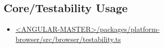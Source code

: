 \subsection{Core/Testability Usage}








\begin{itemize}
  \item \href{https://github.com/angular/angular/blob/master/packages/platform-browser/src/browser/testability.ts}
        {<ANGULAR-MASTER>/packages/platform-browser/src/browser/testability.ts}
\end{itemize}



